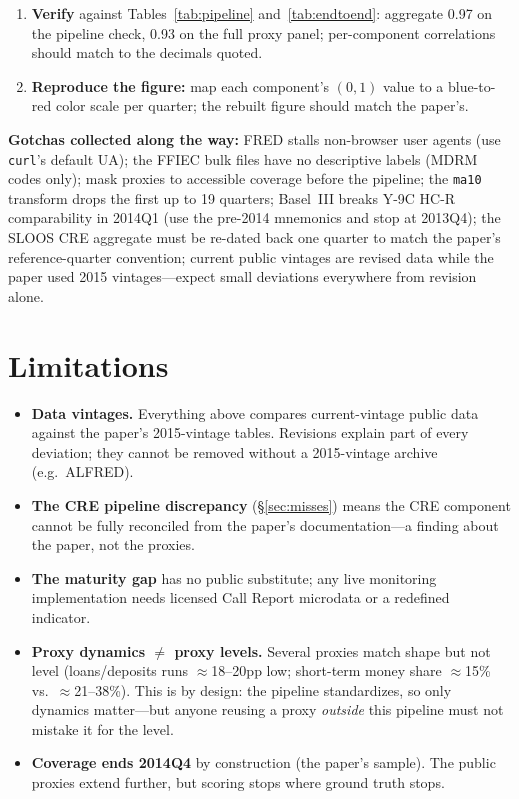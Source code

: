 \documentclass[11pt]{article}
\begin{document}
\begin{enumerate}
\item \textbf{Verify} against Tables~\ref{tab:pipeline}
and~\ref{tab:endtoend}: aggregate 0.97 on the pipeline check, 0.93 on
the full proxy panel; per-component correlations should match to the
decimals quoted.

\item \textbf{Reproduce the figure:} map each component's $(0,1)$ value
to a blue-to-red color scale per quarter; the rebuilt figure should
match the paper's.
\end{enumerate}

\textbf{Gotchas collected along the way:} FRED stalls non-browser user
agents (use \texttt{curl}'s default UA); the FFIEC bulk files have no
descriptive labels (MDRM codes only); mask proxies to accessible coverage
before the pipeline; the \texttt{ma10} transform drops the first up to
19 quarters; Basel~III breaks Y-9C HC-R comparability in 2014Q1 (use the
pre-2014 mnemonics and stop at 2013Q4); the SLOOS CRE aggregate must be
re-dated back one quarter to match the paper's reference-quarter
convention; current public vintages are revised data while the paper used
2015 vintages---expect small deviations everywhere from revision alone.

\section{Limitations}

\begin{itemize}[nosep]
\item \textbf{Data vintages.} Everything above compares current-vintage
public data against the paper's 2015-vintage tables.  Revisions explain
part of every deviation; they cannot be removed without a 2015-vintage
archive (e.g.\ ALFRED).
\item \textbf{The CRE pipeline discrepancy} (\S\ref{sec:misses}) means
the CRE component cannot be fully reconciled from the paper's
documentation---a finding about the paper, not the proxies.
\item \textbf{The maturity gap} has no public substitute; any live
monitoring implementation needs licensed Call Report microdata or a
redefined indicator.
\item \textbf{Proxy dynamics $\ne$ proxy levels.} Several proxies match
shape but not level (loans/deposits runs $\approx$18--20pp low;
short-term money share $\approx$15\% vs.\ $\approx$21--38\%).  This is by
design: the pipeline standardizes, so only dynamics matter---but anyone
reusing a proxy \textit{outside} this pipeline must not mistake it for
the level.
\item \textbf{Coverage ends 2014Q4} by construction (the paper's sample).
The public proxies extend further, but scoring stops where ground truth
stops.
\end{itemize}
\end{document}
